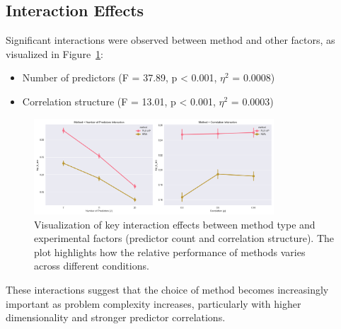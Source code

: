 \subsection{Interaction Effects}
Significant interactions were observed between method and other factors, as visualized in Figure~\ref{fig:interaction_effects}:
\begin{itemize}
    \item Number of predictors (F = 37.89, p < 0.001, $\eta^2$ = 0.0008)
    \item Correlation structure (F = 13.01, p < 0.001, $\eta^2$ = 0.0003)
\end{itemize}

\begin{figure}[htbp]
    \centering
    \includegraphics[width=0.8\textwidth]{figures/finding5_interactions.png}
    \caption{Visualization of key interaction effects between method type and experimental factors (predictor count and correlation structure). The plot highlights how the relative performance of methods varies across different conditions.}
    \label{fig:interaction_effects}
\end{figure}

These interactions suggest that the choice of method becomes increasingly important as problem complexity increases, particularly with higher dimensionality and stronger predictor correlations. 